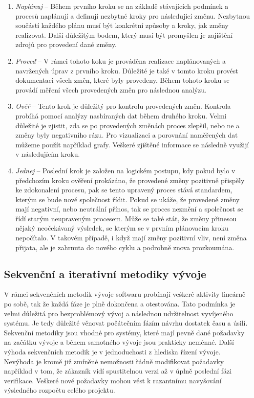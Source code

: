 \documentclass[czech,master,public,dept460,male,cpdeclaration,oneside]{diploma}
\begin{document}
\begin{enumerate}
\item \textit{Naplánuj} -- Během prvního kroku se na základě stávajících podmínek a procesů naplánují a definují nezbytné kroky pro následující změnu. Nezbytnou součástí každého plánu musí být konkrétní způsoby a kroky, jak změny realizovat. Další důležitým bodem, který musí být promyšlen je zajištění zdrojů pro provedení dané změny.
\item \textit{Proveď} -- V rámci tohoto koku je prováděna realizace naplánovaných a navržených úprav z prvního kroku. Důležité je také v tomto kroku provést dokumentaci všech změn, které byly provedeny. Během tohoto kroku se provádí měření všech provedených změn pro následnou analýzu.
\item \textit{Ověř} -- Tento krok je důležitý pro kontrolu provedených změn. Kontrola probíhá pomocí analýzy nasbíraných dat během druhého kroku. Velmi důležité je zjistit, zda se po provedených změnách proces zlepšil, nebo ne a změny byly negativního rázu. Pro vizualizaci a porovnání naměřených dat můžeme použít například grafy. Veškeré zjištěné informace se následně využijí v následujícím kroku.
\item \textit{Jednej} -- Poslední krok je založen na logickém postupu, kdy pokud bylo v předchozím kroku ověření prokázáno, že provedené změny pozitivně přispěly ke zdokonalení procesu, pak se tento upravený proces stává standardem, kterým se bude nově společnost řídit. Pokud se ukáže, že provedené změny mají negativní, nebo neutrální přínos, tak se proces nezmění a společnost se řídí starým neupraveným procesem. Může se také stát, že změny přinesou nějaký neočekávaný výsledek, se kterým se v prvním plánovacím kroku nepočítalo. V takovém případě, i když mají změny pozitivní vliv, není změna přijata, ale je zahrnuta do nového cyklu a podrobně znova prozkoumána.
\end{enumerate}


\subsection{Sekvenční a iterativní metodiky vývoje}
V rámci sekvenčních metodik vývoje softwaru probíhají veškeré aktivity lineárně po sobě, tak že každá fáze je plně dokončena a otestována. Tato podmínka je velmi důležitá pro bezproblémový vývoj a následnou udržitelnost vyvíjeného systému. Je tedy důležité věnovat počátečním fázím návrhu dostatek času a úsilí. Sekvenční metodiky jsou vhodné pro systémy, které mají pevně dané požadavky na začátku vývoje a během samotného vývoje jsou prakticky neměnné. Další výhoda sekvenčních metodik je  v jednoduchosti z hlediska řízení vývoje. Nevýhoda je kromě již zmíněné nemožnosti řádně modifikovat požadavky například v tom, že zákazník vidí spustitelnou verzi až v úplně poslední fázi verifikace. Veškeré nové požadavky mohou vést k razantnímu navyšování výsledného rozpočtu celého projektu.
\end{document}
